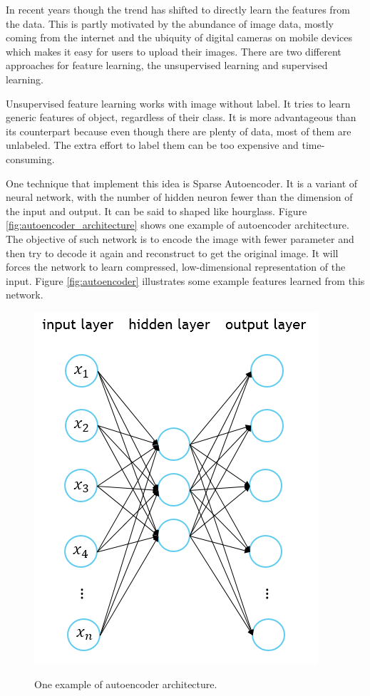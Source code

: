 \documentclass[a4paper,11pt]{kth-mag}
\begin{document}
In recent years though the trend has shifted to directly learn the features from the data. This is partly motivated by the abundance of image data, mostly coming from the internet and the ubiquity of digital cameras on mobile devices which makes it easy for users to upload their images. There are two different approaches for feature learning, the unsupervised learning and supervised learning.

Unsupervised feature learning works with image without label. It tries to learn generic features of object, regardless of their class. It is more advantageous than its counterpart because even though there are plenty of data, most of them are unlabeled. The extra effort to label them can be too expensive and time-consuming.

One technique that implement this idea is Sparse Autoencoder. It is a variant of neural network, with the number of hidden neuron fewer than the dimension of the input and output. It can be said to shaped like hourglass. Figure \ref{fig:autoencoder_architecture} shows one example of autoencoder architecture. The objective of such network is to encode the image with fewer parameter and then try to decode it again and reconstruct to get the original image. It will forces the network to learn compressed, low-dimensional representation of the input. Figure \ref{fig:autoencoder} illustrates some example features learned from this network.

\begin{figure}[h]
\centering
\includegraphics[scale=0.5]{image/autoencoder_architecture.png}
\label{fig:autoencoder_architecture.png}
\caption{One example of autoencoder architecture.}
\end{figure}
\end{document}
